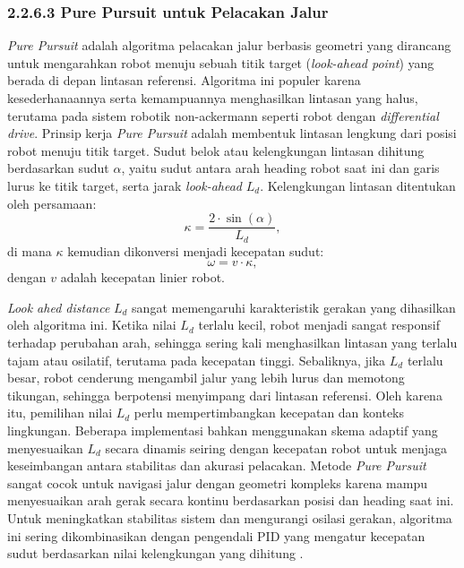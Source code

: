 \subsubsection{2.2.6.3 Pure Pursuit untuk Pelacakan Jalur}

\emph{Pure Pursuit} adalah algoritma pelacakan jalur berbasis geometri yang dirancang untuk mengarahkan robot menuju sebuah titik target (\emph{look-ahead point}) yang berada di depan lintasan referensi. Algoritma ini populer karena kesederhanaannya serta kemampuannya menghasilkan lintasan yang halus, terutama pada sistem robotik non-ackermann seperti robot dengan \emph{differential drive}. Prinsip kerja \emph{Pure Pursuit} adalah membentuk lintasan lengkung dari posisi robot menuju titik target. Sudut belok atau kelengkungan lintasan dihitung berdasarkan sudut \( \alpha \), yaitu sudut antara arah heading robot saat ini dan garis lurus ke titik target, serta jarak \emph{look-ahead} \(L_d\). Kelengkungan lintasan ditentukan oleh persamaan:
\begin{equation}
    \kappa = \frac{2 \cdot \sin(\alpha)}{L_d},
\end{equation}
di mana \( \kappa \) kemudian dikonversi menjadi kecepatan sudut:
\begin{equation}
    \omega = v \cdot \kappa,
\end{equation}
dengan \( v \) adalah kecepatan linier robot.

\emph{Look ahed distance} \(L_d\) sangat memengaruhi karakteristik gerakan yang dihasilkan oleh algoritma ini. Ketika nilai \(L_d\) terlalu kecil, robot menjadi sangat responsif terhadap perubahan arah, sehingga sering kali menghasilkan lintasan yang terlalu tajam atau osilatif, terutama pada kecepatan tinggi. Sebaliknya, jika \(L_d\) terlalu besar, robot cenderung mengambil jalur yang lebih lurus dan memotong tikungan, sehingga berpotensi menyimpang dari lintasan referensi. Oleh karena itu, pemilihan nilai \(L_d\) perlu mempertimbangkan kecepatan dan konteks lingkungan. Beberapa implementasi bahkan menggunakan skema adaptif yang menyesuaikan \(L_d\) secara dinamis seiring dengan kecepatan robot untuk menjaga keseimbangan antara stabilitas dan akurasi pelacakan. Metode \emph{Pure Pursuit} sangat cocok untuk navigasi jalur dengan geometri kompleks karena mampu menyesuaikan arah gerak secara kontinu berdasarkan posisi dan heading saat ini. Untuk meningkatkan stabilitas sistem dan mengurangi osilasi gerakan, algoritma ini sering dikombinasikan dengan pengendali PID yang mengatur kecepatan sudut berdasarkan nilai kelengkungan yang dihitung \cite{coulter1992implementation}.


